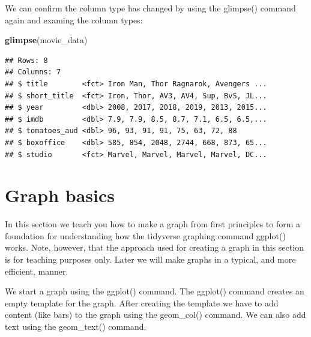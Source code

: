 \documentclass[
]{krantz}
\makeatletter
\newenvironment{Shaded}{\begin{snugshade}}{\end{snugshade}}
\newcommand{\DataTypeTok}[1]{\textcolor[rgb]{0.27,0.27,0.27}{#1}}
\newcommand{\KeywordTok}[1]{\textcolor[rgb]{0.27,0.27,0.27}{\textbf{#1}}}
\newcommand{\NormalTok}[1]{#1}
\newcommand{\OperatorTok}[1]{\textcolor[rgb]{0.43,0.43,0.43}{\textbf{#1}}}
\newcommand{\StringTok}[1]{\textcolor[rgb]{0.5,0.5,0.5}{#1}}
\newenvironment{kframe}{%
\medskip{}
\setlength{\fboxsep}{.8em}
 \def\at@end@of@kframe{}%
 \ifinner\ifhmode%
  \def\at@end@of@kframe{\end{minipage}}%
  \begin{minipage}{\columnwidth}%
 \fi\fi%
 \def\FrameCommand##1{\hskip\@totalleftmargin \hskip-\fboxsep
 \colorbox{shadecolor}{##1}\hskip-\fboxsep
     \hskip-\linewidth \hskip-\@totalleftmargin \hskip\columnwidth}%
 \MakeFramed {\advance\hsize-\width
   \@totalleftmargin\z@ \linewidth\hsize
   \@setminipage}}%
 {\par\unskip\endMakeFramed%
 \at@end@of@kframe}
\renewenvironment{Shaded}{\begin{kframe}}{\end{kframe}}
\makeatother
\begin{document}
\begin{Shaded}
\end{Shaded}

We can confirm the column type has changed by using the glimpse() command again and examing the column types:

\begin{Shaded}
\begin{Highlighting}[]
\KeywordTok{glimpse}\NormalTok{(movie_data)}
\end{Highlighting}
\end{Shaded}

\begin{verbatim}
## Rows: 8
## Columns: 7
## $ title        <fct> Iron Man, Thor Ragnarok, Avengers ...
## $ short_title  <fct> Iron, Thor, AV3, AV4, Sup, BvS, JL...
## $ year         <dbl> 2008, 2017, 2018, 2019, 2013, 2015...
## $ imdb         <dbl> 7.9, 7.9, 8.5, 8.7, 7.1, 6.5, 6.5,...
## $ tomatoes_aud <dbl> 96, 93, 91, 91, 75, 63, 72, 88
## $ boxoffice    <dbl> 585, 854, 2048, 2744, 668, 873, 65...
## $ studio       <fct> Marvel, Marvel, Marvel, Marvel, DC...
\end{verbatim}

\hypertarget{graph-basics}{%
\section{Graph basics}\label{graph-basics}}

In this section we teach you how to make a graph from first principles to form a foundation for understanding how the tidyverse graphing command ggplot() works. Note, however, that the approach used for creating a graph in this section is for teaching purposes only. Later we will make graphs in a typical, and more efficient, manner.

We start a graph using the ggplot() command. The ggplot() command creates an empty template for the graph. After creating the template we have to add content (like bars) to the graph using the geom\_col() command. We can also add text using the geom\_text() command.
\end{document}
